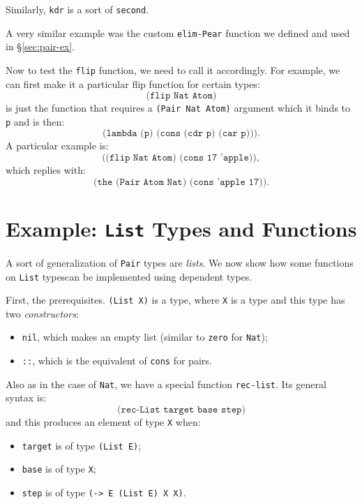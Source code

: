 Similarly, \texttt{kdr} is a sort of \texttt{second}.

A very similar example was the custom \texttt{elim-Pear} function we defined
and used in \S\ref{sec:pair-ex}.

Now to test the \texttt{flip} function, we need to call it accordingly.
For example, we can first make it a particular flip function for certain
types:
\[
  \texttt{(flip Nat Atom)}
\]
is just the function that requires a \texttt{(Pair Nat Atom)} argument
which it binds to \texttt{p} and is then:
\[
  \texttt{(lambda (p) (cons (cdr p) (car p)))}.
\]
A particular example is:
\[
  \texttt{((flip Nat Atom) (cons 17 'apple))},
\]
which replies with:
\[
  \texttt{(the (Pair Atom Nat) (cons 'apple 17))}.
\]

\section{Example: \texttt{List} Types and Functions}
\label{sec:inductive-ex}


A sort of generalization of \texttt{Pair} types are \emph{lists}.
We now show how some functions on \texttt{List} types\footnotemark can
be implemented using dependent types.

First, the prerequisites. \texttt{(List X)} is a type, where \texttt{X}
is a type and this type has two \emph{constructors}:
\begin{itemize}
\item \texttt{nil}, which makes an empty list (similar to \texttt{zero}
  for \texttt{Nat});
\item \texttt{::}, which is the equivalent of \texttt{cons} for pairs.
\end{itemize}

Also as in the case of \texttt{Nat}, we have a special 
function \texttt{rec-list}. Its general syntax is:
\[
  \texttt{(rec-List target base step)}
\]
and this produces an element of type \texttt{X} when:
\begin{itemize}
\item \texttt{target} is of type \texttt{(List E)};
\item \texttt{base} is of type \texttt{X};
\item \texttt{step} is of type \texttt{(-> E (List E) X X)}.
\end{itemize}

